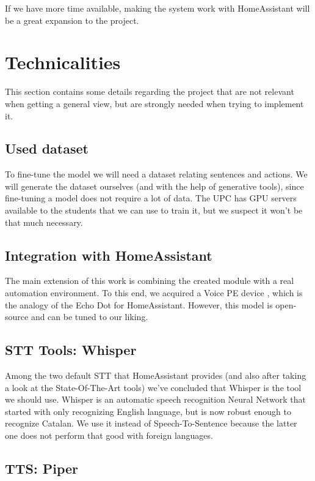 \documentclass{article}
\begin{document}
If we have more time available, making the system work with HomeAssistant will be a great expansion to the project.

\section{Technicalities}

This section contains some details regarding the project that are not relevant when getting a general view, but are strongly needed when trying to implement it.

\subsection{Used dataset}

To fine-tune the model we will need a dataset relating sentences and actions. We will generate the dataset ourselves (and with the help of generative tools), since fine-tuning a model does not require a lot of data. The UPC has GPU servers available to the students that we can use to train it, but we suspect it won't be that much necessary.

\subsection{Integration with HomeAssistant}

The main extension of this work is combining the created module with a real automation environment. To this end, we acquired a Voice PE device \cite{homeassistantvoicepe}, which is the analogy of the Echo Dot for HomeAssistant. However, this model is open-source and can be tuned to our liking.

\subsection{STT Tools: Whisper}

Among the two default STT that HomeAssistant provides (and also after taking a look at the State-Of-The-Art tools) we've concluded that Whisper is the tool we should use. Whisper \cite{whisper} is an automatic speech recognition Neural Network that started with only
recognizing English language, but is now robust enough to recognize Catalan. We use it
instead of Speech-To-Sentence because the latter one does not perform that good with foreign languages.

\subsection{TTS: Piper}
\end{document}
